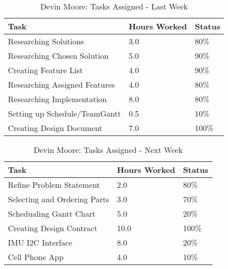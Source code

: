 \documentclass[12pt,article,compsoc]{IEEEtran}
\begin{document}
	\begin{table}[ht]
	\renewcommand{\arraystretch}{1.3}
		\caption{Devin Moore: Tasks Assigned - Last Week}
		
		\label{Summary of Devin Moore's activities: last week}
		
		\centering
		\begin{tabular}{p{5.5cm}|p{1cm}|p{1cm}}

		\hline
		\bfseries 	Task		 		& \bfseries Hours Worked	& \bfseries Status	\\
		\hline\hline
					Researching Solutions					& 3.0						& 80\%				\\
					Researching Chosen Solution				& 5.0						& 90\%				\\
					Creating Feature List					& 4.0						& 90\%				\\
                    Researching Assigned Features           & 4.0                       & 80\%              \\
					Researching Implementation				& 8.0						& 80\%				\\
					Setting up Schedule/TeamGantt			& 0.5						& 10\%				\\
					Creating Design Document				& 7.0						& 100\%				\\
		\hline
		\end{tabular}
	\end{table}

	\begin{table}[ht]
	\renewcommand{\arraystretch}{1.3}
		\caption{Devin Moore: Tasks Assigned - Next Week}
		
		\label{Summary of Devin Moore's activites: this week}
		
		\centering
		\begin{tabular}{p{5.5cm}|p{1cm}|p{1cm}}

		\hline
		\bfseries 	Task		 		& \bfseries Hours Worked	& \bfseries Status	\\
		\hline\hline
			    	Refine Problem Statement    	& 2.0						& 80\%				\\
                    Selecting and Ordering Parts    & 3.0                       & 70\%              \\
					Schedualing Gantt Chart	        & 5.0						& 20\%				\\
                    Creating Design Contract        & 10.0                      & 100\%             \\
                    IMU I2C Interface               & 8.0                       & 20\%              \\
                    Cell Phone App                  & 4.0                       & 10\%              \\
                    \hline
		\end{tabular}
	\end{table}
\end{document}
